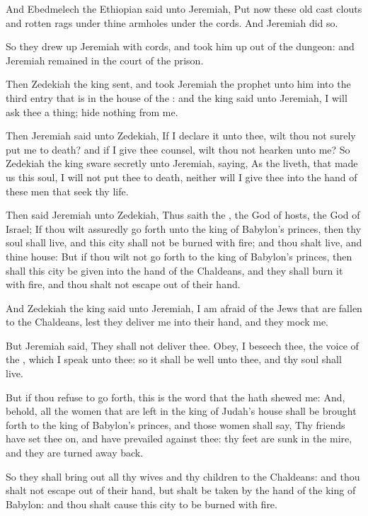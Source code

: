\verse And Ebedmelech the Ethiopian said unto Jeremiah, Put now these old cast clouts and rotten rags under thine armholes under the cords.  And Jeremiah did so.

\verse So they drew up Jeremiah with cords, and took him up out of the dungeon: and Jeremiah remained in the court of the prison.

\verse Then Zedekiah the king sent, and took Jeremiah the prophet unto him into the third entry that is in the house of the \LORD: and the king said unto Jeremiah, I will ask thee a thing; hide nothing from me.

\verse Then Jeremiah said unto Zedekiah, If I declare it unto thee, wilt thou not surely put me to death? and if I give thee counsel, wilt thou not hearken unto me?  \verse So Zedekiah the king sware secretly unto Jeremiah, saying, As the \LORD liveth, that made us this soul, I will not put thee to death, neither will I give thee into the hand of these men that seek thy life.

\verse Then said Jeremiah unto Zedekiah, Thus saith the \LORD, the God of hosts, the God of Israel; If thou wilt assuredly go forth unto the king of Babylon's princes, then thy soul shall live, and this city shall not be burned with fire; and thou shalt live, and thine house: \verse But if thou wilt not go forth to the king of Babylon's princes, then shall this city be given into the hand of the Chaldeans, and they shall burn it with fire, and thou shalt not escape out of their hand.

\verse And Zedekiah the king said unto Jeremiah, I am afraid of the Jews that are fallen to the Chaldeans, lest they deliver me into their hand, and they mock me.

\verse But Jeremiah said, They shall not deliver thee. Obey, I beseech thee, the voice of the \LORD, which I speak unto thee: so it shall be well unto thee, and thy soul shall live.

\verse But if thou refuse to go forth, this is the word that the \LORD hath shewed me: \verse And, behold, all the women that are left in the king of Judah's house shall be brought forth to the king of Babylon's princes, and those women shall say, Thy friends have set thee on, and have prevailed against thee: thy feet are sunk in the mire, and they are turned away back.

\verse So they shall bring out all thy wives and thy children to the Chaldeans: and thou shalt not escape out of their hand, but shalt be taken by the hand of the king of Babylon: and thou shalt cause this city to be burned with fire.


